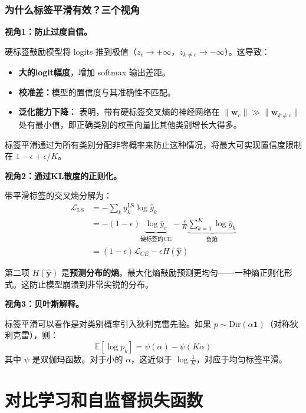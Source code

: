 \subsubsection{为什么标签平滑有效？三个视角}

\textbf{视角1：防止过度自信。}

硬标签鼓励模型将 logits 推到极值（$z_c \to +\infty$，$z_{k \neq c} \to -\infty$）。这导致：
\begin{itemize}
    \item \textbf{大的logit幅度}，增加 softmax 输出差距。
    \item \textbf{校准差：}模型的置信度与其准确性不匹配。
    \item \textbf{泛化能力下降：} \cite{muller2019when} 表明，带有硬标签交叉熵的神经网络在 $\|\mathbf{w}_c\| \gg \|\mathbf{w}_{k \neq c}\|$ 处有最小值，即正确类别的权重向量比其他类别增长大得多。
\end{itemize}

标签平滑通过为所有类别分配非零概率来防止这种情况，将最大可实现置信度限制在 $1 - \epsilon + \epsilon/K$。

\textbf{视角2：通过KL散度的正则化。}

带平滑标签的交叉熵分解为：
\begin{align}
\mathcal{L}_{\text{LS}} &= -\sum_k y_k^{\text{LS}} \log \hat{y}_k \\
&= -(1 - \epsilon)\underbrace{\log \hat{y}_c}_{\text{硬标签的CE}} - \frac{\epsilon}{K}\underbrace{\sum_{k=1}^{K}\log \hat{y}_k}_{\text{负熵}} \\
&= (1 - \epsilon)\mathcal{L}_{CE} - \epsilon H(\hat{\mathbf{y}})
\end{align}

第二项 $H(\hat{\mathbf{y}})$ 是\textbf{预测分布的熵}。最大化熵鼓励预测更均匀——一种熵正则化形式。这防止模型崩溃到非常尖锐的分布。

\textbf{视角3：贝叶斯解释。}

标签平滑可以看作是对类别概率引入狄利克雷先验。如果 $p \sim \text{Dir}(\alpha \mathbf{1})$（对称狄利克雷），则：
\begin{equation}
\mathbb{E}[\log p_k] = \psi(\alpha) - \psi(K\alpha)
\end{equation}
其中 $\psi$ 是双伽玛函数。对于小的 $\alpha$，这近似于 $\log \frac{1}{K}$，对应于均匀标签平滑。

\section{对比学习和自监督损失函数}

